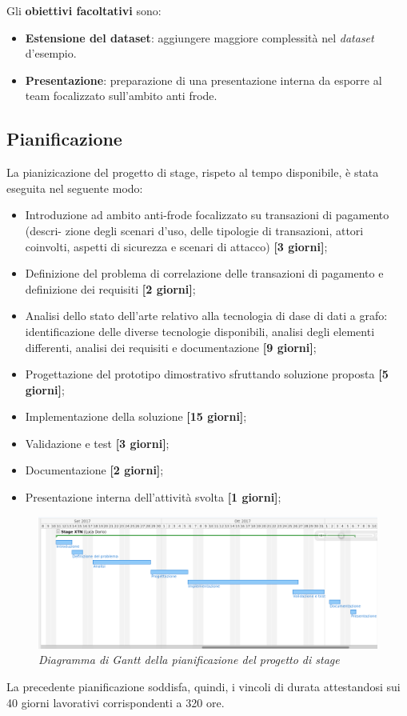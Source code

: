Gli \textbf{obiettivi facoltativi} sono:
\begin{itemize}
\item{\textbf{Estensione del dataset}:} aggiungere maggiore complessità nel \textit{dataset} d'esempio.
\item{\textbf{Presentazione}:} preparazione di una presentazione interna da esporre al team focalizzato sull'ambito anti frode.
\end{itemize}
\newpage
\subsection{Pianificazione}
La pianizicazione del progetto di stage, rispeto al tempo disponibile, è stata eseguita nel seguente modo:
\begin{itemize}
\item Introduzione ad ambito anti-frode focalizzato su transazioni di pagamento (descri-
zione degli scenari d'uso, delle tipologie di transazioni, attori coinvolti, aspetti di
sicurezza e scenari di attacco) \textbf{[3 giorni]};
\item Definizione del problema di correlazione delle transazioni di pagamento e definizione dei requisiti \textbf{[2 giorni]};
\item Analisi dello stato dell'arte relativo alla tecnologia di dase di dati a grafo: identificazione delle diverse tecnologie disponibili, analisi degli elementi differenti, analisi dei requisiti e documentazione \textbf{[9 giorni]};
\item Progettazione del prototipo dimostrativo sfruttando soluzione proposta \textbf{[5 giorni]};
\item Implementazione della soluzione \textbf{[15 giorni]};
\item Validazione e test \textbf{[3 giorni]};
\item Documentazione \textbf{[2 giorni]};
\item Presentazione interna dell'attività svolta \textbf{[1 giorni]};
\end{itemize}
\begin{figure}[h!]
	\includegraphics[scale=0.4]{immagini/gant.png}
	\caption{\textit{Diagramma di Gantt della pianificazione del progetto di stage}}
\end{figure}
La precedente pianificazione soddisfa, quindi, i vincoli di durata attestandosi sui 40 giorni lavorativi corrispondenti a 320 ore.\\
